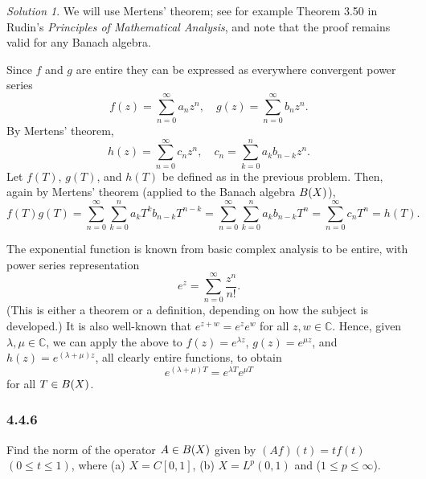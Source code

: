 \documentclass{report}
\newcommand{\bb}[1]{\mathbb{#1}}
\let\sc\relax
\newcommand{\sc}[1]{\mathscr{#1}}
\theoremstyle{remark}
\newtheorem*{solution}{Solution}
\begin{document}
\begin{solution}
  We will use Mertens' theorem; see for example Theorem 3.50 in Rudin's \emph{Principles of Mathematical Analysis}, and note that the proof remains valid for any Banach algebra.

  Since $f$ and $g$ are entire they can be expressed as everywhere convergent power series
  \begin{equation*}
    f(z) = \sum_{n=0}^\infty a_n z^n, \quad g(z) = \sum_{n=0}^\infty b_n z^n.
  \end{equation*}
  By Mertens' theorem,
  \begin{equation*}
    h(z) = \sum_{n=0}^\infty c_n z^n, \quad c_n = \sum_{k=0}^n a_k b_{n-k} z^n.
  \end{equation*}
  Let $f(T)$, $g(T)$, and $h(T)$ be defined as in the previous problem. Then, again by Mertens' theorem (applied to the Banach algebra $\sc B(X)$),
  \begin{equation*}
    f(T)g(T) = \sum_{n=0}^\infty \sum_{k=0}^n a_k T^k b_{n-k} T^{n-k} = \sum_{n=0}^\infty \sum_{k=0}^n a_k b_{n-k} T^n = \sum_{n=0}^\infty c_n T^n = h(T).
  \end{equation*}

  The exponential function is known from basic complex analysis to be entire, with power series representation
  \begin{equation*}
    e^z = \sum_{n=0}^\infty \frac{z^n}{n!}.
  \end{equation*}
  (This is either a theorem or a definition, depending on how the subject is developed.) It is also well-known that $e^{z + w} = e^{z} e^{w}$ for all $z, w \in \bb C$. Hence, given $\lambda, \mu \in \bb C$, we can apply the above to $f(z) = e^{\lambda z}$, $g(z) = e^{\mu z}$, and $h(z) = e^{(\lambda + \mu)z}$, all clearly entire functions, to obtain
  \begin{equation*}
    e^{(\lambda + \mu) T} = e^{\lambda T} e^{\mu T}
  \end{equation*}
  for all $T \in \sc B(X)$.
\end{solution}

\subsubsection*{4.4.6}
Find the norm of the operator $A \in \sc B(X)$ given by $(Af)(t) = tf(t)$ $(0 \le t \le 1)$, where (a) $X = C[0,1]$, (b) $X = L^p(0,1)$ and ($1 \le p \le \infty$).
\end{document}
